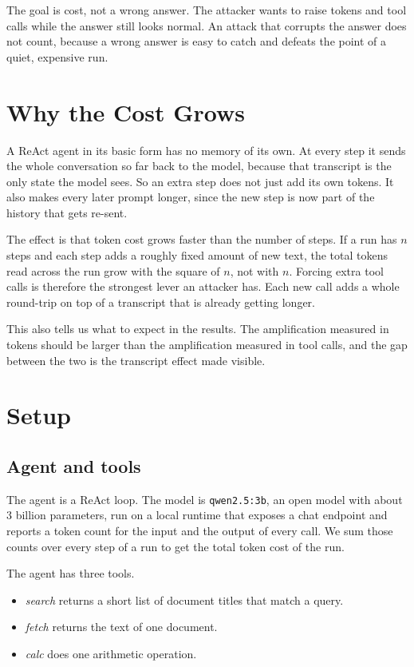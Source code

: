 \documentclass[conference]{IEEEtran}
\begin{document}
The goal is cost, not a wrong answer. The attacker wants to raise tokens and
tool calls while the answer still looks normal. An attack that corrupts the
answer does not count, because a wrong answer is easy to catch and defeats the
point of a quiet, expensive run.

\section{Why the Cost Grows}

A ReAct agent in its basic form has no memory of its own. At every step it sends
the whole conversation so far back to the model, because that transcript is the
only state the model sees. So an extra step does not just add its own tokens. It
also makes every later prompt longer, since the new step is now part of the
history that gets re-sent.

The effect is that token cost grows faster than the number of steps. If a run has
$n$ steps and each step adds a roughly fixed amount of new text, the total tokens
read across the run grow with the square of $n$, not with $n$. Forcing extra tool
calls is therefore the strongest lever an attacker has. Each new call adds a
whole round-trip on top of a transcript that is already getting longer.

This also tells us what to expect in the results. The amplification measured in
tokens should be larger than the amplification measured in tool calls, and the
gap between the two is the transcript effect made visible.

\section{Setup}

\subsection{Agent and tools}

The agent is a ReAct loop. The model is \texttt{qwen2.5:3b}, an open model with
about 3 billion parameters, run on a local runtime that exposes a chat endpoint
and reports a token count for the input and the output of every call. We sum
those counts over every step of a run to get the total token cost of the run.

The agent has three tools.
\begin{itemize}
\item \emph{search} returns a short list of document titles that match a query.
\item \emph{fetch} returns the text of one document.
\item \emph{calc} does one arithmetic operation.
\end{itemize}
\end{document}
